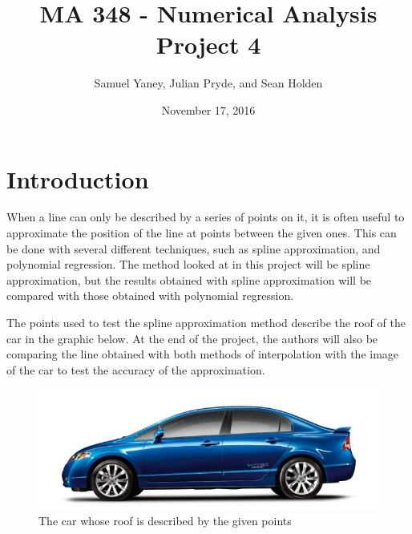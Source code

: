 \documentclass[12pt, letterpaper]{article} %
\begin{document}
\title{MA 348 - Numerical Analysis \\ Project 4}
\author{Samuel Yaney, Julian Pryde, and Sean Holden}
\date{November 17, 2016}
\maketitle

\section*{Introduction}


When a line can only be described by a series of points on it, it is often useful to approximate the position of the line at points between the given ones. This can be done with several different techniques, such as spline approximation, and polynomial regression. The method looked at in this project will be spline approximation, but the results obtained with spline approximation will be compared with those obtained with polynomial regression.

The points used to test the spline approximation method describe the roof of the car in the graphic below. At the end of the project, the authors will also be comparing the line obtained with both methods of interpolation with the image of the car to test the accuracy of the approximation.

\begin{center}
	\begin{figure}
		\includegraphics[scale=0.5]{Car.png}
		\caption{The car whose roof is described by the given points}
	\end{figure}
\end{center}
\end{document}
